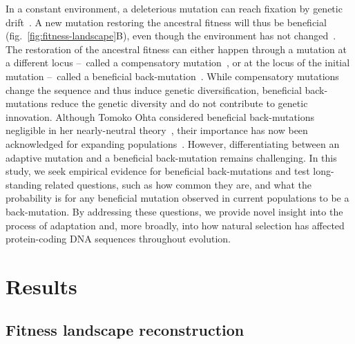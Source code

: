 \documentclass{article}
\begin{document}
    In a constant environment, a deleterious mutation can reach fixation by genetic drift~\cite{Ohta1992}.
    A new mutation restoring the ancestral fitness will thus be beneficial (fig.~\ref{fig:fitness-landscape}B), even though the environment has not changed~\cite{hartl_compensatory_1996, sella_application_2005, mustonen_fitness_2009, cvijovic_fate_2015}.
    The restoration of the ancestral fitness can either happen through a mutation at a different locus – called a compensatory mutation~\cite{hartl_compensatory_1996, mustonen_fitness_2009}, or at the locus of the initial mutation – called a beneficial back-mutation~\cite{piganeau_estimating_2003, charlesworth_other_2007}.
    While compensatory mutations change the sequence and thus induce genetic diversification, beneficial back-mutations reduce the genetic diversity and do not contribute to genetic innovation.
    Although Tomoko Ohta considered beneficial back-mutations negligible in her nearly-neutral theory~\cite{Ohta1992}, their importance has now been acknowledged for expanding populations~\cite{charlesworth_other_2007}.
    However, differentiating between an adaptive mutation and a beneficial back-mutation remains challenging\cite{chi_detecting_2020}.
    In this study, we seek empirical evidence for beneficial back-mutations and test long-standing related questions, such as how common they are, and what the probability is for any beneficial mutation observed in current populations to be a back-mutation.
    By addressing these questions, we provide novel insight into the process of adaptation and, more broadly, into how natural selection has affected protein-coding DNA sequences throughout evolution.

\section*{Results}
    \subsection*{Fitness landscape reconstruction}
\end{document}
